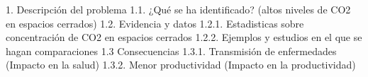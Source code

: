 






1. Descripción del problema
    1.1. ¿Qué se ha identificado? (altos niveles de CO2 en espacios cerrados)
    1.2. Evidencia y datos
        1.2.1. Estadisticas sobre concentración de CO2 en espacios cerrados
        1.2.2. Ejemplos y estudios en el que se hagan comparaciones
    1.3 Consecuencias
        1.3.1. Transmisión de enfermedades (Impacto en la salud)
        1.3.2. Menor productividad (Impacto en la productividad)



